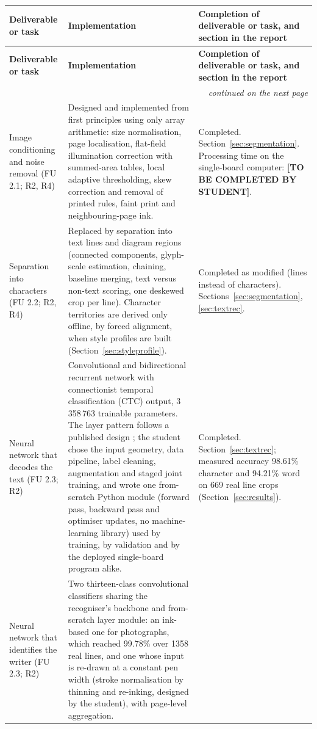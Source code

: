 {
\fontsize{9.5}{11.5}\selectfont
\setlength{\tabcolsep}{4pt}
\renewcommand{\arraystretch}{1.05}
\begin{longtable}{|p{3.3cm}|p{7.0cm}|p{4.3cm}|}
\hline
\textbf{Deliverable or task} & \textbf{Implementation} & \textbf{Completion of deliverable or task, and section in the report} \\
\hline
\endfirsthead
\hline
\textbf{Deliverable or task} & \textbf{Implementation} & \textbf{Completion of deliverable or task, and section in the report} \\
\hline
\endhead
\hline
\multicolumn{3}{r}{\emph{continued on the next page}}\\
\endfoot
\hline
\endlastfoot
Image conditioning and noise removal (FU 2.1; R2, R4) &
Designed and implemented from first principles using only array arithmetic: size normalisation, page localisation, flat-field illumination correction with summed-area tables, local adaptive thresholding, skew correction and removal of printed rules, faint print and neighbouring-page ink. &
Completed. Section~\ref{sec:segmentation}. Processing time on the single-board computer: \textbf{[TO BE COMPLETED BY STUDENT]}. \\
\hline
Separation into characters (FU 2.2; R2, R4) &
Replaced by separation into text lines and diagram regions (connected components, glyph-scale estimation, chaining, baseline merging, text versus non-text scoring, one deskewed crop per line). Character territories are derived only offline, by forced alignment, when style profiles are built (Section~\ref{sec:styleprofile}). &
Completed as modified (lines instead of characters). Sections~\ref{sec:segmentation}, \ref{sec:textrec}. \\
\hline
Neural network that decodes the text (FU 2.3; R2) &
Convolutional and bidirectional recurrent network with connectionist temporal classification (CTC) output, 3\,358\,763 trainable parameters. The layer pattern follows a published design \cite{kizilirmak2023}; the student chose the input geometry, data pipeline, label cleaning, augmentation and staged joint training, and wrote one from-scratch Python module (forward pass, backward pass and optimiser updates, no machine-learning library) used by training, by validation and by the deployed single-board program alike. &
Completed. Section~\ref{sec:textrec}; measured accuracy 98.61\% character and 94.21\% word on 669 real line crops (Section~\ref{sec:results}). \\
\hline
Neural network that identifies the writer (FU 2.3; R2) &
Two thirteen-class convolutional classifiers sharing the recogniser's backbone and from-scratch layer module: an ink-based one for photographs, which reached 99.78\% over 1358 real lines, and one whose input is re-drawn at a constant pen width (stroke normalisation by thinning and re-inking, designed by the student), with page-level aggregation. &

\end{longtable}}
